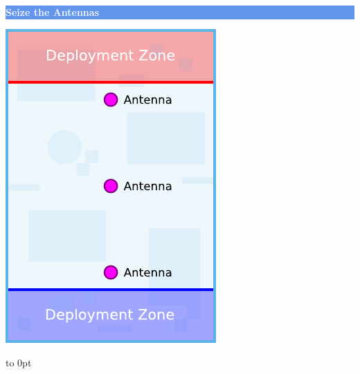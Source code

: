 \documentclass[14pt,dvipsnames]{extarticle}
\begin{document}
\hfill
\begin{minipage}{2in}\centering
\colorbox{CornflowerBlue}{\parbox[t][12pt]{\linewidth}{\centering\textcolor{White}{\textbf{Seize the Antennas}}}}

\smallskip
\includegraphics[scale=0.9]{maps/map-seizetheantennas}
\end{minipage}
%
\hfill
\hbox to 0pt{}
\end{document}
